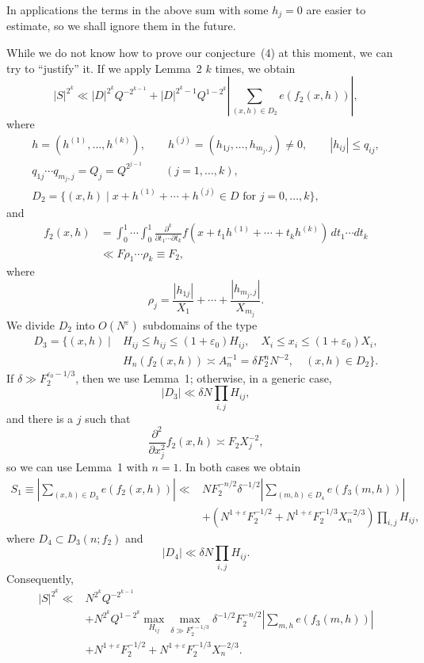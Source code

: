 \documentclass[10pt]{article}
\begin{document}
In applications the terms in the above sum with some $h_j=0$ are easier to estimate, so we shall ignore them in the future.

While we do not know how to prove our conjecture~(4) at this moment, we can try to ``justify'' it. If we apply Lemma~2 $k$ times, we obtain
\[
  |S|^{2^k}\ll |D|^{2^k}Q^{-2^{k-1}}
  +|D|^{2^k-1}Q^{1-2^k}
  \left|\sum_{(x,h)\in D_2}e(f_2(x,h))\right|,
\]
where
\[
\begin{gathered}
  h=(h^{(1)},\ldots,h^{(k)}),
  \qquad h^{(j)}=(h_{1j},\ldots,h_{m_j,j})\ne0,
  \qquad |h_{ij}|\leqslant q_{ij},\\
  q_{1j}\cdots q_{m_j,j}=Q_j=Q^{2^{j-1}}
  \qquad(j=1,\ldots,k),\\
  D_2=\{(x,h)\mid x+h^{(1)}+\cdots+h^{(j)}\in D
  \text{ for }j=0,\ldots,k\},
\end{gathered}
\]
and
\[
\begin{aligned}
  f_2(x,h)
  &=\int_0^1\cdots\int_0^1
  \frac{\partial^k}{\partial t_1\cdots\partial t_k}
  f(x+t_1h^{(1)}+\cdots+t_kh^{(k)})\,dt_1\cdots dt_k\\
  &\ll F\rho_1\cdots\rho_k\equiv F_2,
\end{aligned}
\]
where
\[
  \rho_j=\frac{|h_{1j}|}{X_1}+\cdots+\frac{|h_{m_j,j}|}{X_{m_j}}.
\]
We divide $D_2$ into $O(N^\varepsilon)$ subdomains of the type
\[
\begin{aligned}
D_3=\{(x,h)\mid{}&H_{ij}\leqslant h_{ij}\leqslant(1+\varepsilon_0)H_{ij},
\quad X_i\leqslant x_i\leqslant(1+\varepsilon_0)X_i,\\
& H_n(f_2(x,h))\asymp A_n^{-1}=\delta F_2^nN^{-2},
\quad (x,h)\in D_2\}.
\end{aligned}
\]
If $\delta\gg F_2^{\varepsilon_0-1/3}$, then we use Lemma~1; otherwise, in a generic case,
\[
  |D_3|\ll\delta N\prod_{i,j}H_{ij},
\]
and there is a $j$ such that
\[
  \frac{\partial^2}{\partial x_j^2}f_2(x,h)\asymp F_2X_j^{-2},
\]
so we can use Lemma~1 with $n=1$. In both cases we obtain
\[
\begin{aligned}
S_1\equiv\left|\sum_{(x,h)\in D_3}e(f_2(x,h))\right|
\ll{}&NF_2^{-n/2}\delta^{-1/2}
\left|\sum_{(m,h)\in D_4}e(f_3(m,h))\right|\\
&+\left(N^{1+\varepsilon}F_2^{-1/2}
 +N^{1+\varepsilon}F_2^{-1/3}X_n^{-2/3}\right)\prod_{i,j}H_{ij},
\end{aligned}
\]
where $D_4\subset D_3(n;f_2)$ and
\[
  |D_4|\ll\delta N\prod_{i,j}H_{ij}.
\]
Consequently,
\[
\begin{aligned}
|S|^{2^k}\ll{}&N^{2^k}Q^{-2^{k-1}}\\
&+N^{2^k}Q^{1-2^k}
 \max_{H_{ij}}\max_{\delta\gg F_2^{\varepsilon-1/3}}
 \delta^{-1/2}F_2^{-n/2}
 \left|\sum_{m,h}e(f_3(m,h))\right|\\
&+N^{1+\varepsilon}F_2^{-1/2}
 +N^{1+\varepsilon}F_2^{-1/3}X_n^{-2/3}.
\end{aligned}
\]
\end{document}
